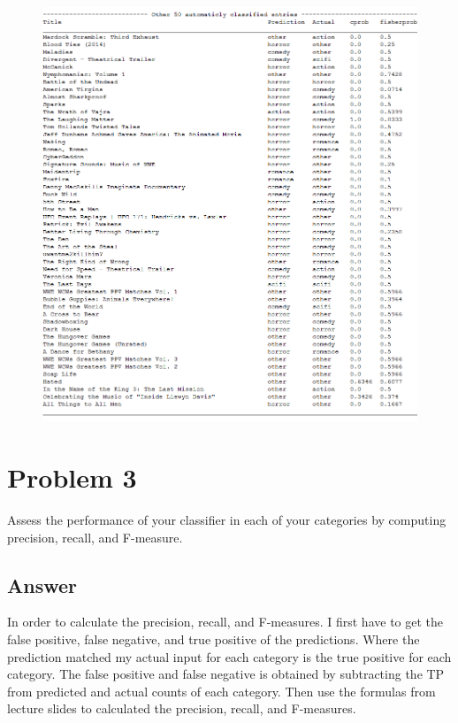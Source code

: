 \documentclass[12pt]{article}
\begin{document}
\begin{figure}[h!]
\centering
\includegraphics[width=6.5in]{bot50.png}
\end{figure}
\pagebreak




\section*{Problem 3}

Assess the performance of your classifier in each of your
categories by computing precision, recall, and F-measure. 

\subsection*{Answer}
In order to calculate the precision, recall, and F-measures. I first have to get the false positive, false negative, and true positive of the predictions. Where the prediction matched my actual input for each category is the true positive for each category. The false positive and false negative is obtained by subtracting the TP from predicted and actual counts of each category. Then use the formulas from lecture slides to calculated the precision, recall, and F-measures.
\end{document}
